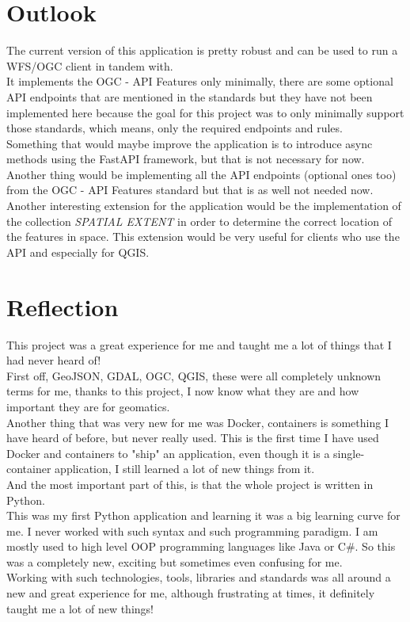 \section{Outlook}
The current version of this application is pretty robust and can be used to run a WFS/OGC client in tandem with.\\
It implements the OGC - API Features only minimally, there are some optional API endpoints that are mentioned in the standards but they have not been implemented here because the goal for this project was to only minimally support those standards, which means, only the required endpoints and rules.\\
\newline
Something that would maybe improve the application is to introduce async methods using the FastAPI framework, but that is not necessary for now.\\
Another thing would be implementing all the API endpoints (optional ones too) from the OGC - API Features standard but that is as well not needed now.\\
Another interesting extension for the application would be the implementation of the collection \textit{SPATIAL EXTENT} in order to determine the correct location of the features in space. This extension would be very useful for clients who use the API and especially for QGIS.
\section{Reflection}
This project was a great experience for me and taught me a lot of things that I had never heard of!\\
First off, GeoJSON, GDAL, OGC, QGIS, these were all completely unknown terms for me, thanks to this project, I now know what they are and how important they are for geomatics.\\
\newline
Another thing that was very new for me was Docker, containers is something I have heard of before, but never really used. This is the first time I have used Docker and containers to "ship" an application, even though it is a single-container application, I still learned a lot of new things from it.\\
\newline
And the most important part of this, is that the whole project is written in Python.\\
This was my first Python application and learning it was a big learning curve for me. I never worked with such syntax and such programming paradigm. I am mostly used to high level OOP programming languages like Java or C\#. So this was a completely new, exciting but sometimes even confusing for me.\\
\newline
Working with such technologies, tools, libraries and standards was all around a new and great experience for me, although frustrating at times, it definitely taught me a lot of new things!